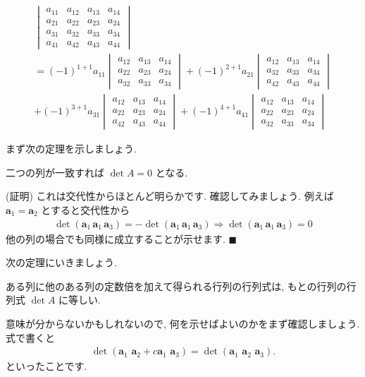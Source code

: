 \documentclass[openany, a4paper, oneside]{jsbook}
\begin{document}
\begin{gather}
 \begin{vmatrix} a_{11} & a_{12} & a_{13} & a_{14} \\
 a_{21} & a_{22} & a_{23} & a_{24} \\
 a_{31} & a_{32} & a_{33} & a_{34} \\
 a_{41} & a_{42} & a_{43} & a_{44}
 \end{vmatrix}\\
 =
 (-1)^{1+1}a_{11}
 \begin{vmatrix} a_{12} & a_{13} & a_{14} \\
 a_{22} & a_{23} & a_{24} \\
 a_{32} & a_{33} & a_{34}
 \end{vmatrix}
 +(-1)^{2+1}a_{21}
 \begin{vmatrix}
 a_{12} & a_{13} & a_{14} \\
 a_{32} & a_{33} & a_{34} \\
 a_{42} & a_{43} & a_{44}
 \end{vmatrix} \\
 +(-1)^{3+1}a_{31}
 \begin{vmatrix}
 a_{12} & a_{13} & a_{14} \\
 a_{22} & a_{23} & a_{24} \\
 a_{42} & a_{43} & a_{44}
 \end{vmatrix}
 +(-1)^{4+1}a_{41}
 \begin{vmatrix} a_{12} & a_{13} & a_{14} \\
 a_{22} & a_{23} & a_{24} \\
 a_{32} & a_{33} & a_{34}
 \end{vmatrix}
\end{gather}

まず次の定理を示しましょう.
\begin{thm}
 二つの列が一致すれば $\det A = 0$ となる.
\end{thm}
(証明)
これは交代性からほとんど明らかです. 確認してみましょう. 例えば $\bm{a}_{1}=\bm{a}_{2}$ とすると交代性から
\begin{align}
    \det ( \bm{a}_{1} \, \bm{a}_{1} \, \bm{a}_{3} ) = - \det ( \bm{a}_{1} \, \bm{a}_{1} \, \bm{a}_{3} )
    \Longrightarrow \det ( \bm{a}_{1} \, \bm{a}_{1} \, \bm{a}_{3} ) = 0
\end{align}
他の列の場合でも同様に成立することが示せます.  $\blacksquare$

次の定理にいきましょう.
\begin{thm}ある列に他のある列の定数倍を加えて得られる行列の行列式は, もとの行列の行列式 $\det A$ に等しい.
\end{thm}
意味が分からないかもしれないので, 何を示せばよいのかをまず確認しましょう. 式で書くと
\begin{align}
    \det ( \bm{a}_{1} \,\, \bm{a}_{2} + c\bm{a}_{1} \,\, \bm{a}_{3} ) = \det ( \bm{a}_{1} \,\, \bm{a}_{2} \,\, \bm{a}_{3} ).
\end{align}
といったことです.
\end{document}
